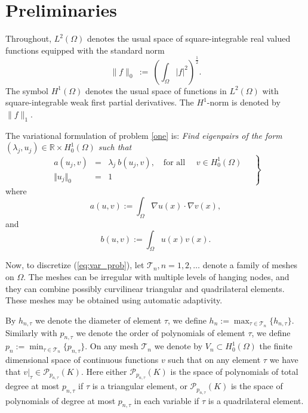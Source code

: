 \documentclass[preprint,12pt]{elsarticle}
\newcommand{\cT}{\mathcal{T}}
\begin{document}

\section{Preliminaries}\label{sec:preli}

Throughout, $L^2(\Omega)$
denotes the usual space of square-integrable real valued functions
equipped with the standard norm
\begin{equation}\label{eq:l2}
\|f\|_{0}\ := \ \left(\int_\Omega  |f|^2\right)^{\frac{1}{2}} .
\end{equation}
The symbol $H^1(\Omega)$ denotes the usual space of functions in $L^2(\Omega)$
with square-integrable weak first partial derivatives. The $H^1$-norm is 
denoted by $\|f\|_1$.

The variational formulation of problem \eqref{one} is:
\emph{Find eigenpairs of the form $(\lambda_j,u_j)\in
\mathbb{R}\times H^1_0(\Omega)$
such that}
\begin{equation}
\label{eq:var_prob}
\left.
\begin{array}{lcl}
a(u_j,v)&=& \lambda_j\ b(u_j,v),
\quad \text{for all } \quad v  \in H^1_0(\Omega)\\
 \Vert u_j \Vert_{0} &=& 1
\end{array}\quad
\right\}
\end{equation}
where
\begin{equation}\label{eq:a}
a(u,v):=\int_\Omega \nabla u(x)\cdot \nabla v(x),
\end{equation}
and
\begin{equation}\label{eq:b}
b(u,v):=\int_\Omega u(x) v(x).
\end{equation}

Now, to discretize (\ref{eq:var_prob}), let $\cT_n, n =
1,2,\ldots $ denote a family of meshes on $\Omega$.
The meshes can be irregular with multiple levels of hanging nodes, 
and they can combine possibly curvilinear triangular and quadrilateral 
elements. These meshes may be obtained using automatic adaptivity. 

By $h_{n,\tau}$ we denote the diameter of element $\tau$,  
we define
$
h_n:=\max_{\tau\in \mathcal{T}_n}\{h_{n,\tau}\}.
$
Similarly with  $p_{n,\tau}$ we denote  the order of polynomials of element $\tau$,  
we define
$
p_n:=\min_{\tau\in \mathcal{T}_n}\{p_{n,\tau}\}.
$
On any mesh $\mathcal{T}_n$ we denote by $V_n \subset H^1_0(\Omega)$ the finite
dimensional space of continuous functions $v$ such that on any element $\tau$ we 
have that $v|_\tau\in \mathcal{P}_{p_{n,\tau}}(K)$. Here either $\mathcal{P}_{p_{n,\tau}}(K)$ 
is the space of polynomials of total degree at most $p_{n,\tau}$ if $\tau$ is a triangular 
element, or $\mathcal{P}_{p_{n,\tau}}(K)$ is the space of polynomials of degree at most 
$p_{n,\tau}$ in each variable if $\tau$ is a quadrilateral element.
\end{document}
